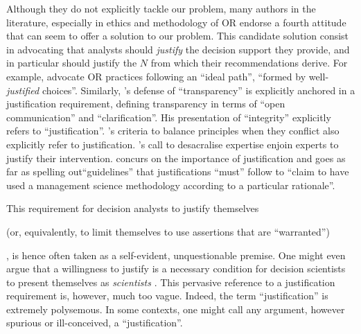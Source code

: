 \documentclass[preprint, french, english, 11pt, authoryear]{elsarticle}%
\begin{document}
\begin{changebar}
Although they do not explicitly tackle our problem, many authors in the literature, especially in ethics and methodology of \ac{OR}
endorse a fourth attitude that can seem to offer a solution to our problem. This candidate solution consist in advocating that analysts should \emph{justify} the decision support they provide, and in particular should justify the $N$ from which their recommendations derive.
For example, \citet{lahtinen_why_2017} advocate \ac{OR} practices following an ``ideal path'', ``formed by well-\emph{justified} choices''.
Similarly, \citet{diekmann_moral_2013}'s defense of ``transparency'' is explicitly anchored in a justification requirement, defining transparency in terms of ``open communication'' and ``clarification''. His presentation of ``integrity'' explicitly refers to ``justification''.
 \citet{beauchamp_principles_2009}'s criteria to balance principles when they conflict also explicitly refer to justification.
\citet{white_death_1994}'s call to desacralise expertise enjoin experts to justify their intervention.
\citet{jackson_towards_1999} concurs on the importance of justification and goes as far as spelling out``guidelines'' that justifications ``must'' follow to “claim to have used a management science methodology according to a particular rationale''.
\end{changebar}

This requirement for decision analysts to justify themselves
\begin{changebar}(or, equivalently, to limit themselves to use assertions that are ``warranted'')\end{changebar}, is hence often taken as a self-evident, unquestionable premise. 
One might even argue that a willingness to justify is a necessary condition for decision scientists to present themselves as \emph{scientists} \citep{ormerod_justifying_2010}. 
This pervasive reference to a justification requirement is, however, much too vague. Indeed, the term ``justification'' is extremely polysemous. 
In some contexts, one might call any argument, however spurious or ill-conceived, a ``justification''.

\end{document}
